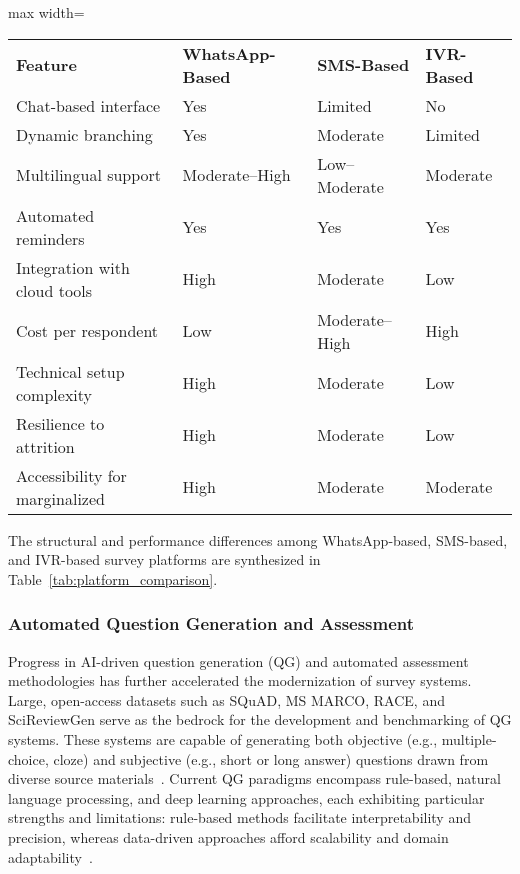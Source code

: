 \begin{table*}[htbp]
\centering
\caption{Comparative Features of Automated Survey Platforms Utilizing WhatsApp, SMS, and IVR}
\label{tab:platform_comparison}
\begin{adjustbox}{max width=\textwidth}
\begin{tabular}{@{}llll@{}}
\toprule
\textbf{Feature} & \textbf{WhatsApp-Based} & \textbf{SMS-Based} & \textbf{IVR-Based} \\
Chat-based interface & Yes & Limited & No \\
Dynamic branching & Yes & Moderate & Limited \\
Multilingual support & Moderate–High & Low–Moderate & Moderate \\
Automated reminders & Yes & Yes & Yes \\
Integration with cloud tools & High & Moderate & Low \\
Cost per respondent & Low & Moderate–High & High \\
Technical setup complexity & High & Moderate & Low \\
Resilience to attrition & High & Moderate & Low \\
Accessibility for marginalized & High & Moderate & Moderate \\
\bottomrule
\end{tabular}
\end{adjustbox}
\end{table*}

The structural and performance differences among WhatsApp-based, SMS-based, and IVR-based survey platforms are synthesized in Table~\ref{tab:platform_comparison}.

\subsubsection{Automated Question Generation and Assessment}

Progress in AI-driven question generation (QG) and automated assessment methodologies has further accelerated the modernization of survey systems. Large, open-access datasets such as SQuAD, MS MARCO, RACE, and SciReviewGen serve as the bedrock for the development and benchmarking of QG systems. These systems are capable of generating both objective (e.g., multiple-choice, cloze) and subjective (e.g., short or long answer) questions drawn from diverse source materials~\cite{ref1,ref2,ref3,ref39,ref40,ref44,ref48,ref50,ref72,ref84,ref86,ref88,ref89,ref90,ref96,ref97,ref104}. Current QG paradigms encompass rule-based, natural language processing, and deep learning approaches, each exhibiting particular strengths and limitations: rule-based methods facilitate interpretability and precision, whereas data-driven approaches afford scalability and domain adaptability~\cite{ref1,ref3,ref40,ref44}.

